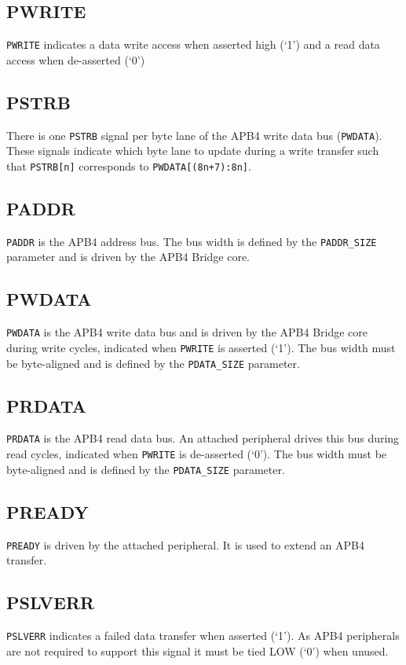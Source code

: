 \subsection{PWRITE}\label{pwrite}

\texttt{PWRITE} indicates a data write access when asserted high (`1') and a read
data access when de-asserted (`0')

\subsection{PSTRB}\label{pstrb}

There is one \texttt{PSTRB} signal per byte lane of the APB4 write data bus
(\texttt{PWDATA}). These signals indicate which byte lane to update during a
write transfer such that \texttt{PSTRB[n]} corresponds to
\texttt{PWDATA[(8n+7):8n]}.

\subsection{PADDR}\label{paddr}

\texttt{PADDR} is the APB4 address bus. The bus width is defined by the
\texttt{PADDR\_SIZE} parameter and is driven by the APB4 Bridge core.

\subsection{PWDATA}\label{pwdata}

\texttt{PWDATA} is the APB4 write data bus and is driven by the APB4 Bridge core
during write cycles, indicated when \texttt{PWRITE} is asserted (`1'). The bus
width must be byte-aligned and is defined by the \texttt{PDATA\_SIZE} parameter.

\subsection{PRDATA}\label{prdata}

\texttt{PRDATA} is the APB4 read data bus. An attached peripheral drives this bus
during read cycles, indicated when \texttt{PWRITE} is de-asserted (`0'). The bus
width must be byte-aligned and is defined by the \texttt{PDATA\_SIZE} parameter.

\subsection{PREADY}\label{pready}

\texttt{PREADY} is driven by the attached peripheral. It is used to extend an
APB4 transfer.

\subsection{PSLVERR}\label{pslverr}

\texttt{PSLVERR} indicates a failed data transfer when asserted (`1'). As APB4
peripherals are not required to support this signal it must be tied LOW
(`0') when unused.